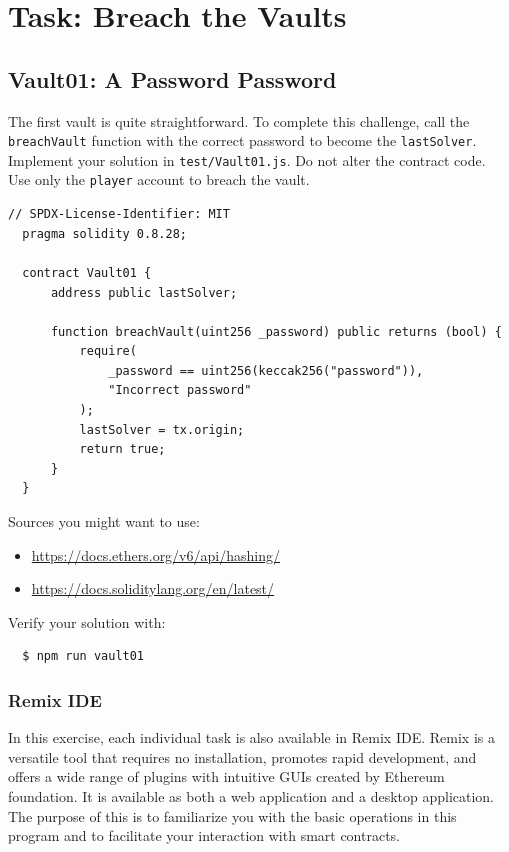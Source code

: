 \documentclass[12pt]{article}
\begin{document}
\section{Task: Breach the Vaults}
\subsection*{Vault01: A Password Password}
The first vault is quite straightforward. To complete this challenge, call the
\texttt{breachVault} function with the correct password to become the
\texttt{lastSolver}. Implement your solution in \texttt{test/Vault01.js}. Do
not alter the contract code. Use only the \texttt{player} account to breach the
vault.

\noindent
\begin{minipage}{\textwidth}
    \begin{lstlisting}[language=Solidity]
  // SPDX-License-Identifier: MIT
  pragma solidity 0.8.28;
  
  contract Vault01 {
      address public lastSolver;
  
      function breachVault(uint256 _password) public returns (bool) {
          require(
              _password == uint256(keccak256("password")),
              "Incorrect password"
          );
          lastSolver = tx.origin;
          return true;
      }
  }  
\end{lstlisting}
\end{minipage}

\medskip
\noindent
Sources you might want to use:
\begin{itemize}
    \item \href{https://docs.ethers.org/v6/api/hashing/}{https://docs.ethers.org/v6/api/hashing/}
    \item \href{https://docs.soliditylang.org/en/latest/}{https://docs.soliditylang.org/en/latest/}
\end{itemize}

\medskip
\noindent
Verify your solution with:
\begin{verbatim}
  $ npm run vault01
\end{verbatim}

\subsubsection*{Remix IDE}

In this exercise, each individual task is also available in Remix IDE. Remix is
a versatile tool that requires no installation, promotes rapid development, and
offers a wide range of plugins with intuitive GUIs created by Ethereum
foundation. It is available as both a web application and a desktop
application. The purpose of this is to familiarize you with the basic
operations in this program and to facilitate your interaction with smart
contracts.
\end{document}
